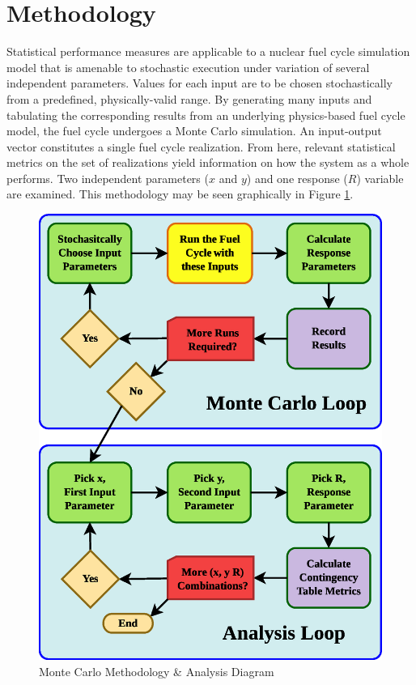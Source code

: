 \documentclass[a4paper, 12pt]{article}
\begin{document}
\section{Methodology}
\label{sec:methodology}

Statistical performance measures are applicable to a nuclear fuel cycle simulation model that
is amenable to stochastic execution under variation of several independent parameters.  Values
for each input are to be chosen stochastically from a predefined, physically-valid range.
By generating many inputs and tabulating the corresponding results from an underlying physics-based
fuel cycle model, the fuel cycle undergoes a Monte Carlo simulation.  An input-output vector
constitutes a single fuel cycle realization.  From here, relevant statistical metrics on the set of
realizations yield information on how the system as a whole performs.  
Two independent parameters ($x$ and $y$) and one response ($R$) variable are examined.
This methodology may be seen graphically in Figure \ref{mcmethod}.

\begin{figure}[htbp]
\begin{center}
\includegraphics[scale=0.70]{MonteCarloMethodology.eps}
\caption{Monte Carlo Methodology \& Analysis Diagram}
\label{mcmethod}
\end{center}
\end{figure}
\end{document}
